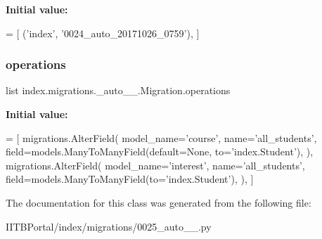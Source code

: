 {\bfseries Initial value\+:}
\begin{DoxyCode}
=  [
        (\textcolor{stringliteral}{'index'}, \textcolor{stringliteral}{'0024\_auto\_20171026\_0759'}),
    ]
\end{DoxyCode}
\mbox{\label{classindex_1_1migrations_1_10025__auto__20171026__0822_1_1Migration_afebe87dfcdec8441904efecbc1bbca09}} 
\subsubsection{\texorpdfstring{operations}{operations}}
{\footnotesize\ttfamily list index.\+migrations.\+\_\+auto\+\_\+\_.\+Migration.\+operations\hspace{0.3cm}{\ttfamily [static]}}

{\bfseries Initial value\+:}
\begin{DoxyCode}
=  [
        migrations.AlterField(
            model\_name=\textcolor{stringliteral}{'course'},
            name=\textcolor{stringliteral}{'all\_students'},
            field=models.ManyToManyField(default=\textcolor{keywordtype}{None}, to=\textcolor{stringliteral}{'index.Student'}),
        ),
        migrations.AlterField(
            model\_name=\textcolor{stringliteral}{'interest'},
            name=\textcolor{stringliteral}{'all\_students'},
            field=models.ManyToManyField(to=\textcolor{stringliteral}{'index.Student'}),
        ),
    ]
\end{DoxyCode}


The documentation for this class was generated from the following file\+:\begin{DoxyCompactItemize}
\item 
I\+I\+T\+B\+Portal/index/migrations/0025\+\_\+auto\+\_\+\_.\+py\end{DoxyCompactItemize}
